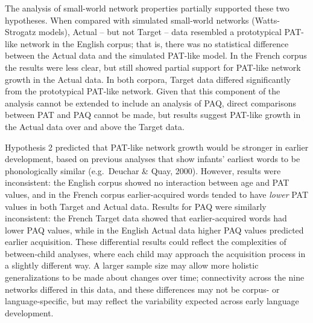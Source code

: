 \documentclass[
  english,
  man,floatsintext]{apa6}
\begin{document}
The analysis of small-world network properties partially supported these two hypotheses. When compared with simulated small-world networks (Watts-Strogatz models), Actual -- but not Target -- data resembled a prototypical PAT-like network in the English corpus; that is, there was no statistical difference between the Actual data and the simulated PAT-like model. In the French corpus the results were less clear, but still showed partial support for PAT-like network growth in the Actual data. In both corpora, Target data differed significantly from the prototypical PAT-like network. Given that this component of the analysis cannot be extended to include an analysis of PAQ, direct comparisons between PAT and PAQ cannot be made, but results suggest PAT-like growth in the Actual data over and above the Target data.

Hypothesis 2 predicted that PAT-like network growth would be stronger in earlier development, based on previous analyses that show infants' earliest words to be phonologically similar (e.g.~Deuchar \& Quay, 2000). However, results were inconsistent: the English corpus showed no interaction between age and PAT values, and in the French corpus earlier-acquired words tended to have \emph{lower} PAT values in both Target and Actual data. Results for PAQ were similarly inconsistent: the French Target data showed that earlier-acquired words had lower PAQ values, while in the English Actual data higher PAQ values predicted earlier acquisition. These differential results could reflect the complexities of between-child analyses, where each child may approach the acquisition process in a slightly different way. A larger sample size may allow more holistic generalizations to be made about changes over time; connectivity across the nine networks differed in this data, and these differences may not be corpus- or language-specific, but may reflect the variability expected across early language development.
\end{document}
